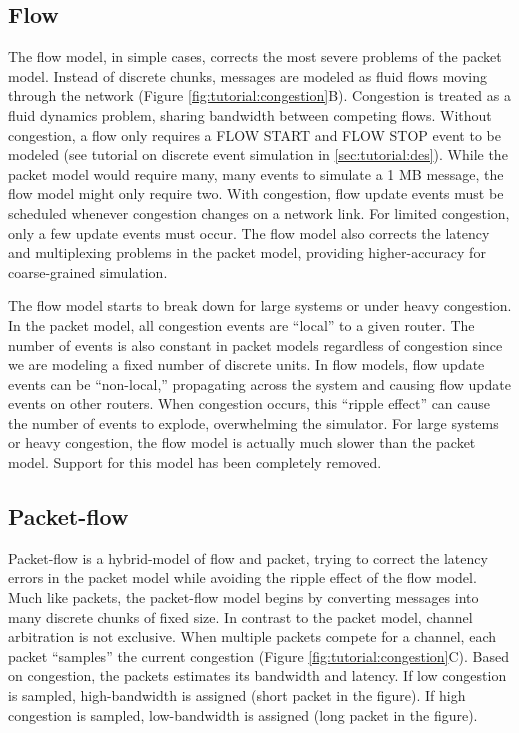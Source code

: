 \subsection{Flow}
\label{subsec:tutorial:flow}
The flow model, in simple cases, corrects the most severe problems of the packet model.
Instead of discrete chunks, messages are modeled as fluid flows moving through the network (Figure \ref{fig:tutorial:congestion}B).
Congestion is treated as a fluid dynamics problem, sharing bandwidth between competing flows.
Without congestion, a flow only requires a FLOW START and FLOW STOP event to be modeled (see tutorial on discrete event simulation in \ref{sec:tutorial:des}).
While the packet model would require many, many events to simulate a 1 MB message, the flow model might only require two.
With congestion, flow update events must be scheduled whenever congestion changes on a network link.  
For limited congestion, only a few update events must occur.
The flow model also corrects the latency and multiplexing problems in the packet model, providing higher-accuracy for coarse-grained simulation.

The flow model starts to break down for large systems or under heavy congestion.
In the packet model, all congestion events are ``local'' to a given router.  
The number of events is also constant in packet models regardless of congestion since we are modeling a fixed number of discrete units.
In flow models, flow update events can be ``non-local,'' propagating across the system and causing flow update events on other routers.
When congestion occurs, this ``ripple effect'' can cause the number of events to explode, overwhelming the simulator.
For large systems or heavy congestion, the flow model is actually much slower than the packet model. Support for this model has been completely removed.


\subsection{Packet-flow}
\label{subsec:tutorial:train}
Packet-flow is a hybrid-model of flow and packet, trying to correct the latency errors in the packet model while avoiding the ripple effect of the flow model.
Much like packets, the packet-flow model begins by converting messages into many discrete chunks of fixed size.
In contrast to the packet model, channel arbitration is not exclusive.  
When multiple packets compete for a channel, each packet ``samples'' the current congestion (Figure \ref{fig:tutorial:congestion}C).
Based on congestion, the packets estimates its bandwidth and latency.
If low congestion is sampled, high-bandwidth is assigned (short packet in the figure).
If high congestion is sampled, low-bandwidth is assigned (long packet in the figure).

